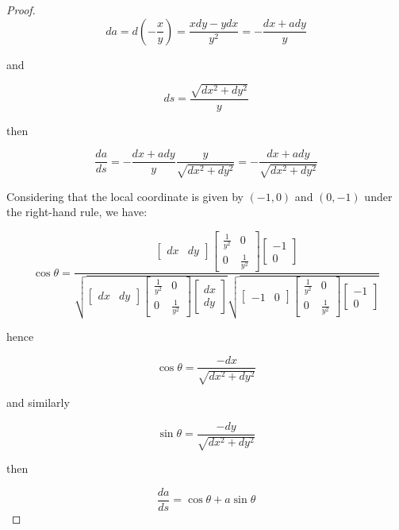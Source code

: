 \begin{proof}
$$
da = d(-\frac{x}{y}) = \frac{xdy - ydx}{y^2} = -\frac{dx + ady}{y}
$$

and

$$
ds = \frac{\sqrt{dx^2 + dy^2}}{y}
$$

then

$$
\frac{da}{ds} = - \frac{dx + ady}{y} \frac{y}{\sqrt{dx^2 + dy^2}} = - \frac{dx + ady}{\sqrt{dx^2 + dy^2}}
$$

Considering that the local coordinate is given by $(-1, 0)$ and $(0, -1)$ under the right-hand rule, we have:

$$
\cos \theta = \frac{\begin{bmatrix} dx & dy \end{bmatrix} \begin{bmatrix} \frac{1}{y^2} & 0 \\ 0 & \frac{1}{y^2} \end{bmatrix} \begin{bmatrix} -1 \\ 0 \end{bmatrix}}{\sqrt{\begin{bmatrix} dx & dy \end{bmatrix} \begin{bmatrix} \frac{1}{y^2} & 0 \\ 0 & \frac{1}{y^2} \end{bmatrix} \begin{bmatrix} dx \\ dy \end{bmatrix}}\sqrt{\begin{bmatrix} -1 & 0 \end{bmatrix} \begin{bmatrix} \frac{1}{y^2} & 0 \\ 0 & \frac{1}{y^2} \end{bmatrix} \begin{bmatrix} -1 \\ 0 \end{bmatrix}}}
$$

hence

$$
\cos \theta = \frac{-dx}{\sqrt{dx^2 + dy^2}}
$$

and similarly

$$
\sin \theta = \frac{-dy}{\sqrt{dx^2 + dy^2}}
$$

then

$$
\frac{da}{ds} = \cos \theta + a \sin \theta
$$

\end{proof}


